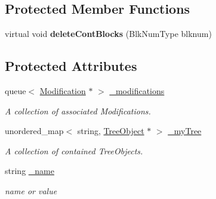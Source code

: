 \subsection*{Protected Member Functions}
\begin{DoxyCompactItemize}
\item 
\mbox{\label{classTreeObject_a74c73604c877bec03f6188147af7c509}} 
virtual void {\bfseries delete\+Cont\+Blocks} (Blk\+Num\+Type blknum)
\end{DoxyCompactItemize}
\subsection*{Protected Attributes}
\begin{DoxyCompactItemize}
\item 
\mbox{\label{classTreeObject_ac285793f5d7cba8069670210606c66c7}} 
queue$<$ \mbox{\hyperlink{classModification}{Modification}} $\ast$ $>$ \mbox{\hyperlink{classTreeObject_ac285793f5d7cba8069670210606c66c7}{\+\_\+modifications}}
\begin{DoxyCompactList}\small\item\em A collection of associated Modifications. \end{DoxyCompactList}\item 
\mbox{\label{classTreeObject_a59effca19a3475c84496c7f82c856d38}} 
unordered\+\_\+map$<$ string, \mbox{\hyperlink{classTreeObject}{Tree\+Object}} $\ast$ $>$ \mbox{\hyperlink{classTreeObject_a59effca19a3475c84496c7f82c856d38}{\+\_\+my\+Tree}}
\begin{DoxyCompactList}\small\item\em A collection of contained Tree\+Objects. \end{DoxyCompactList}\item 
\mbox{\label{classTreeObject_a368b410ed9b21c7106babf2ba93399b3}} 
string \mbox{\hyperlink{classTreeObject_a368b410ed9b21c7106babf2ba93399b3}{\+\_\+name}}
\begin{DoxyCompactList}\small\item\em name or value \end{DoxyCompactList}\item 
\mbox{\label{classTreeObject_a17cfa5bde700978b4ec326909362bd2c}} 

\end{DoxyCompactItemize}
